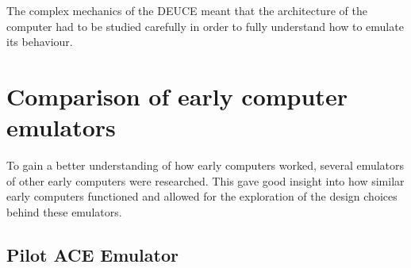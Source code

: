 \documentclass{l4proj}
\begin{document}
The complex mechanics of the DEUCE meant that the architecture of the computer had to be studied carefully in order to fully understand how to emulate its behaviour.

\section{Comparison of early computer emulators}
To gain a better understanding of how early computers worked, several emulators of other early computers were researched. This gave good insight into how similar early computers functioned and allowed for the exploration of the design choices behind these emulators.

\subsection{Pilot ACE Emulator} 
\end{document}
